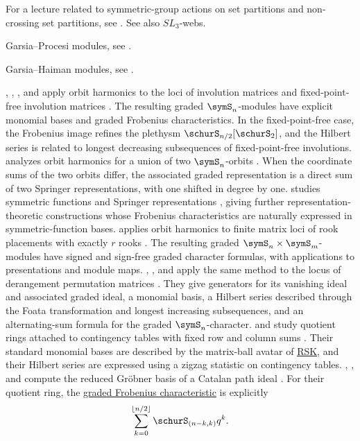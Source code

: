 \begin{example}
For a lecture related to symmetric-group actions on set partitions and
non-crossing set partitions, see \cite{GOCC2022SkeinActionEmbedding}.
See also $SL_3$-webs.
\end{example}


\begin{example}
Garsia--Procesi modules, see \cite{CarlssonChou2024x}.
\end{example}

\begin{example}
Garsia--Haiman modules, see \cite{Armon2022}.
\end{example}

\begin{example}
, , , and
 apply orbit harmonics to the loci of involution matrices and
fixed-point-free involution matrices \cite{LiuMaRhoadesZhu2025}.  The
resulting graded $\symS_n$-modules have explicit monomial bases and graded
Frobenius characteristics.  In the fixed-point-free case, the Frobenius image
refines the plethysm $\schurS_{n/2}[\schurS_2]$, and the Hilbert series is
related to longest decreasing subsequences of fixed-point-free involutions.
 analyzes orbit harmonics for a union of two
$\symS_n$-orbits \cite{Griffin2022Orbit}.  When the coordinate sums of the two
orbits differ, the associated graded representation is a direct sum of two
Springer representations, with one shifted in degree by one.
 studies symmetric functions and Springer representations
\cite{Kato2022}, giving further representation-theoretic constructions whose
Frobenius characteristics are naturally expressed in symmetric-function bases.
 applies orbit harmonics to finite matrix loci of rook
placements with exactly $r$ rooks \cite{Zhu2026RookOrbit}.  The resulting
graded $\symS_n\times\symS_m$-modules have signed and sign-free graded
character formulas, with applications to presentations and module maps.
, , and  apply the
same method to the locus of derangement permutation matrices
\cite{LiLiuRhoades2026x}.  They give generators for its vanishing ideal and
associated graded ideal, a monomial basis, a Hilbert series described through
the Foata transformation and longest increasing subsequences, and an
alternating-sum formula for the graded $\symS_n$-character.
 and  study quotient rings attached
to contingency tables with fixed row and column sums
\cite{OhRhoades2025x}.  Their standard monomial bases are described by the
matrix-ball avatar of \hyperref[rsk]{RSK}, and their Hilbert series are
expressed using a zigzag statistic on contingency tables.
, , and 
compute the reduced Gr{\"o}bner basis of a Catalan path ideal
\cite{BergeronMootooVyas2022}.
For their quotient ring, the \hyperref[frobeniusCharacteristic]{graded
Frobenius characteristic} is explicitly
\[
\sum_{k=0}^{\lfloor n/2 \rfloor} \schurS_{(n-k,k)} q^k.
\]
\end{example}
